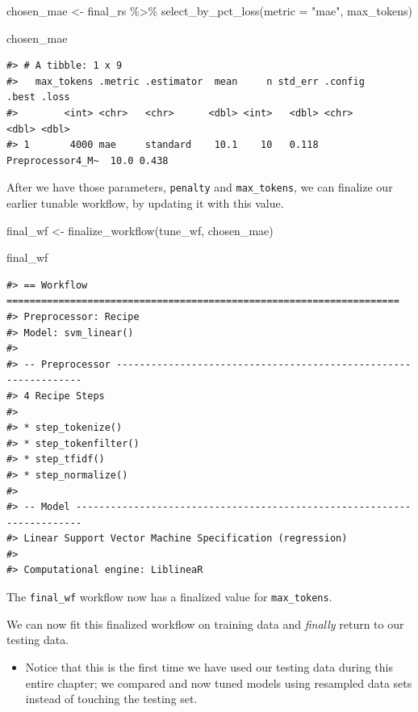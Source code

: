 \documentclass[
]{krantz}
\makeatletter
\newenvironment{Shaded}{\begin{snugshade}}{\end{snugshade}}
\newcommand{\AttributeTok}[1]{\textcolor[rgb]{0.77,0.63,0.00}{#1}}
\newcommand{\FunctionTok}[1]{\textcolor[rgb]{0.00,0.00,0.00}{#1}}
\newcommand{\NormalTok}[1]{#1}
\newcommand{\OtherTok}[1]{\textcolor[rgb]{0.56,0.35,0.01}{#1}}
\newcommand{\SpecialCharTok}[1]{\textcolor[rgb]{0.00,0.00,0.00}{#1}}
\newcommand{\StringTok}[1]{\textcolor[rgb]{0.31,0.60,0.02}{#1}}
\newenvironment{kframe}{%
\medskip{}
\setlength{\fboxsep}{.8em}
 \def\at@end@of@kframe{}%
 \ifinner\ifhmode%
  \def\at@end@of@kframe{\end{minipage}}%
  \begin{minipage}{\columnwidth}%
 \fi\fi%
 \def\FrameCommand##1{\hskip\@totalleftmargin \hskip-\fboxsep
 \colorbox{shadecolor}{##1}\hskip-\fboxsep
     \hskip-\linewidth \hskip-\@totalleftmargin \hskip\columnwidth}%
 \MakeFramed {\advance\hsize-\width
   \@totalleftmargin\z@ \linewidth\hsize
   \@setminipage}}%
 {\par\unskip\endMakeFramed%
 \at@end@of@kframe}
\renewenvironment{Shaded}{\begin{kframe}}{\end{kframe}}
\newenvironment{rmdblock}[1]
  {\begin{shaded*}
  \begin{itemize}[left = -1cm, labelsep = 1cm]
  \renewcommand{\labelitemi}{
    \raisebox{-.7\height}[0pt][0pt]{
      {\setkeys{Gin}{width=3em,keepaspectratio}\texttt{[image: images/\#1]}}
    }
  }
 
  \item
  }
  {
  \end{itemize}
  \end{shaded*}
  }
\newenvironment{rmdwarning}
  {\begin{rmdblock}{warning}}
  {\end{rmdblock}}
\makeatother
\begin{document}
\begin{Shaded}
\begin{Highlighting}[]
\NormalTok{chosen\_mae }\OtherTok{\textless{}{-}}\NormalTok{ final\_rs }\SpecialCharTok{\%\textgreater{}\%}
  \FunctionTok{select\_by\_pct\_loss}\NormalTok{(}\AttributeTok{metric =} \StringTok{"mae"}\NormalTok{, max\_tokens)}

\NormalTok{chosen\_mae}
\end{Highlighting}
\end{Shaded}

\begin{verbatim}
#> # A tibble: 1 x 9
#>   max_tokens .metric .estimator  mean     n std_err .config          .best .loss
#>        <int> <chr>   <chr>      <dbl> <int>   <dbl> <chr>            <dbl> <dbl>
#> 1       4000 mae     standard    10.1    10   0.118 Preprocessor4_M~  10.0 0.438
\end{verbatim}

After we have those parameters, \texttt{penalty} and \texttt{max\_tokens}, we can finalize our earlier tunable workflow, by updating it with this value.

\begin{Shaded}
\begin{Highlighting}[]
\NormalTok{final\_wf }\OtherTok{\textless{}{-}} \FunctionTok{finalize\_workflow}\NormalTok{(tune\_wf, chosen\_mae)}

\NormalTok{final\_wf}
\end{Highlighting}
\end{Shaded}

\begin{verbatim}
#> == Workflow ====================================================================
#> Preprocessor: Recipe
#> Model: svm_linear()
#> 
#> -- Preprocessor ----------------------------------------------------------------
#> 4 Recipe Steps
#> 
#> * step_tokenize()
#> * step_tokenfilter()
#> * step_tfidf()
#> * step_normalize()
#> 
#> -- Model -----------------------------------------------------------------------
#> Linear Support Vector Machine Specification (regression)
#> 
#> Computational engine: LiblineaR
\end{verbatim}

The \texttt{final\_wf} workflow now has a finalized value for \texttt{max\_tokens}.

We can now fit this finalized workflow on training data and \emph{finally} return to our testing data.

\begin{rmdwarning}
Notice that this is the first time we have used our testing data during
this entire chapter; we compared and now tuned models using resampled
data sets instead of touching the testing set.
\end{rmdwarning}
\end{document}
